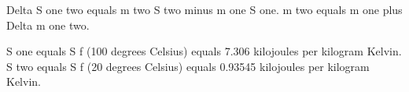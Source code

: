 Delta S one two equals m two S two minus m one S one.  
m two equals m one plus Delta m one two.  

S one equals S f (100 degrees Celsius) equals 7.306 kilojoules per kilogram Kelvin.  
S two equals S f (20 degrees Celsius) equals 0.93545 kilojoules per kilogram Kelvin.